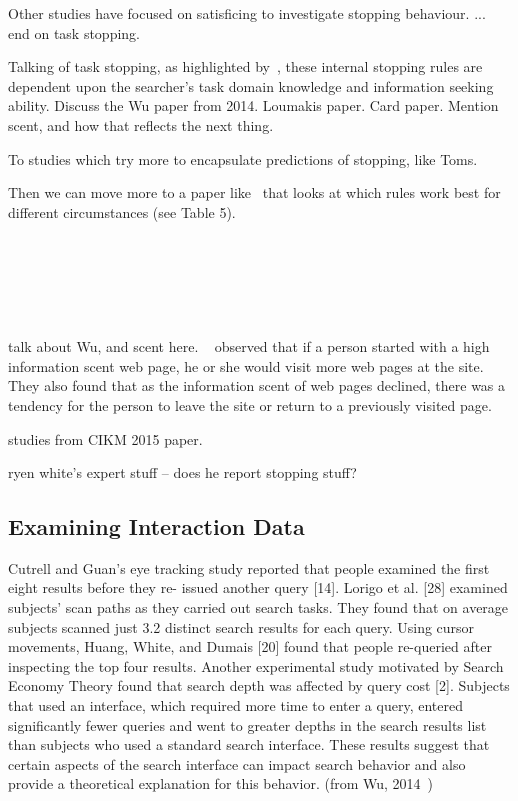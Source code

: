 Other studies have focused on satisficing to investigate stopping behaviour.
...
end on task stopping.

Talking of task stopping, as highlighted by~\cite{marchionini1995information_seeking}, these internal stopping rules are dependent upon the searcher's task domain knowledge and information seeking ability. Discuss the Wu paper from 2014.
Loumakis paper.
Card paper. Mention scent, and how that reflects the next thing.

To studies which try more to encapsulate predictions of stopping, like Toms.

Then we can move more to a paper like~\cite{browne2004stopping_rules} that looks at which rules work best for different circumstances (see Table 5).



~\cite{berryman2006defines}


~\cite{toms2009predicting_stopping}
~\cite{zach2005enough_is_enough}
~\cite{dostert2009satisficing}


~\cite{wu2012dc}
~\cite{wu2014information_scent}
~\cite{wu2014stopping_query_abandonment}


talk about Wu, and scent here.
~\cite{card2001scent_graphs} observed that if a person started with a high information scent web page, he or she would visit more web pages at the site. They also found that as the information scent of web pages declined, there was a tendency for the person to leave the site or return to a previously visited page.

studies from CIKM 2015 paper.

ryen white's expert stuff -- does he report stopping stuff?


\subsection{Examining Interaction Data}
Cutrell and Guan’s eye tracking study reported that people examined the first eight results before they re- issued another query [14]. Lorigo et al. [28] examined subjects’ scan paths as they carried out search tasks. They found that on average subjects scanned just 3.2 distinct search results for each query. Using cursor movements, Huang, White, and Dumais [20] found that people re-queried after inspecting the top four results. Another experimental study motivated by Search Economy Theory found that search depth was affected by query cost [2]. Subjects that used an interface, which required more time to enter a query, entered significantly fewer queries and went to greater depths in the search results list than subjects who used a standard search interface. These results suggest that certain aspects of the search interface can impact search behavior and also provide a theoretical explanation for this behavior. (from Wu, 2014~\cite{wu2014information_scent})


